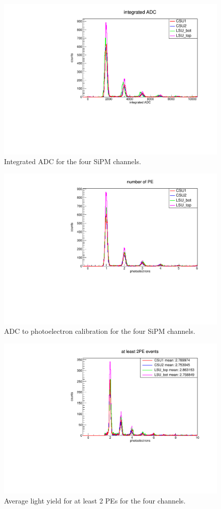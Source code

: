 \documentclass[12pt,a4paper,final]{iopart}
\begin{document}
\begin{figure}
  \centering
  \includegraphics[angle=270,origin=c,width=.7\textwidth]{figures/integratedADC.pdf}
  \caption{Integrated ADC for the four SiPM channels.}
  \label{fig:cddfadc}
\end{figure}

\begin{figure}
  \centering
  \includegraphics[angle=270,origin=c,width=.7\textwidth]{figures/calibrated_spectra.pdf}
  \caption{ADC to photoelectron calibration for the four SiPM channels.}
  \label{fig:cddfcalibrated}
\end{figure}

\begin{figure}
  \centering
  \includegraphics[angle=270,origin=c,width=.7\textwidth]{figures/avgPE.pdf}
  \caption{Average light yield for at least 2 PEs for the four channels.}
  \label{fig:cddfly}
\end{figure}
\end{document}
